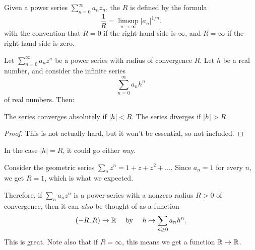 \begin{definition}
	Given a power series $\sum_{n=0}^{\infty} a_n z_n$,
	the  $R$ is defined
	by the formula
	\[ \frac 1R = \limsup_{n \to \infty} \left\lvert a_n \right\rvert^{1/n}. \]
	with the convention that $R = 0$ if the right-hand side is $\infty$,
	and $R = \infty$ if the right-hand side is zero.
\end{definition}
\begin{theorem}
	Let $\sum_{n=0}^{\infty} a_n z^n$
	be a power series with radius of convergence $R$.
	Let $h$ be a real number, and consider the infinite series
	\[ \sum_{n=0}^\infty a_n h^n \]
	of real numbers.
	Then:
	\begin{itemize}
		\ii The series converges absolutely if $|h| < R$.
		\ii The series diverges if $|h| > R$.
	\end{itemize}
\end{theorem}
\begin{proof}
	This is not actually hard,
	but it won't be essential, so not included.
\end{proof}
\begin{remark}
	In the case $|h| = R$, it could go either way.
\end{remark}
\begin{example}
	Consider the geometric series $\sum_{n} z^n = 1 + z + z^2 + \dots$.
	Since $a_n = 1$ for every $n$, we get $R = 1$,
	which is what we expected.
\end{example}

Therefore, if $\sum_n a_n z^n$ is a power
series with a nonzero radius $R > 0$ of convergence,
then it can \emph{also} be thought of as a function
\[ (-R, R) \to \mathbb R
	\quad\text{ by }\quad
	h \mapsto \sum_{n \ge 0} a_n h^n. \]
This is great.
Note also that if $R = \infty$,
this means we get a function $\mathbb R \to \mathbb R$.

